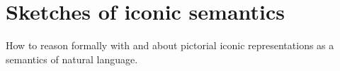 



\maketitle%

\tableofcontents{}


\chapter{Sketches of iconic semantics}\label{chapter:contrel}
How to reason formally with and about pictorial iconic representations as a semantics of natural language.
%
%
%
%
%

\clearpage
\newpage

\clearpage
\newpage

\clearpage
\newpage









